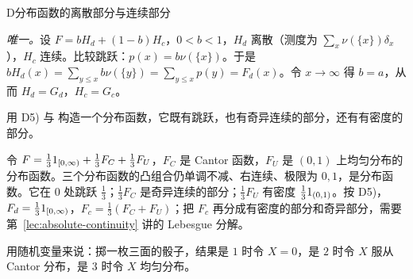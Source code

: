 \begin{probleme}{D}{分布函数的离散部分与连续部分}
\begin{questions}
\begin{solution}
\emph{唯一。}设 $F=bH_d+(1-b)H_c$，$0<b<1$，$H_d$ 离散（测度为 $\sum_x\nu(\{x\})\delta_x$），$H_c$ 连续。比较跳跃：$p(x)=b\nu(\{x\})$。于是 $bH_d(x)=\sum_{y\leqslant x}b\nu(\{y\})=\sum_{y\leqslant x}p(y)=F_d(x)$。令 $x\to\infty$ 得 $b=a$，从而 $H_d=G_d$，$H_c=G_c$。
\end{solution}
\item 用 D5) 与 构造一个分布函数，它既有跳跃，也有奇异连续的部分，还有有密度的部分。
\begin{solution}
令 $F=\frac131_{[0,\infty)}+\frac13F_C+\frac13F_U$，$F_C$ 是 Cantor 函数，$F_U$ 是 $(0,1)$ 上均匀分布的分布函数。三个分布函数的凸组合仍单调不减、右连续、极限为 $0,1$，是分布函数。它在 $0$ 处跳跃 $\frac13$；$\frac13F_C$ 是奇异连续的部分；$\frac13F_U$ 有密度 $\frac131_{(0,1)}$。按 D5)，$F_d=\frac131_{[0,\infty)}$，$F_c=\frac13(F_C+F_U)$；把 $F_c$ 再分成有密度的部分和奇异部分，需要第~\ref{lec:absolute-continuity} 讲的 Lebesgue 分解。

用随机变量来说：掷一枚三面的骰子，结果是 $1$ 时令 $X=0$，是 $2$ 时令 $X$ 服从 Cantor 分布，是 $3$ 时令 $X$ 均匀分布。
\end{solution}
\end{questions}
\end{probleme}

\thinkingpart

